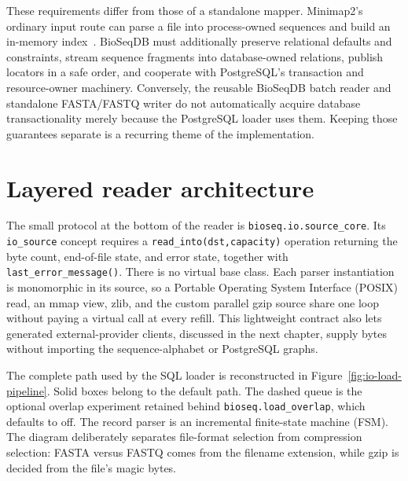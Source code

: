 These requirements differ from those of a standalone mapper. Minimap2's
ordinary input route can parse a file into process-owned sequences and build an
in-memory index~\cite{minimap2_paper}. BioSeqDB must additionally preserve
relational defaults and constraints, stream sequence fragments into
database-owned relations, publish locators in a safe order, and cooperate with
PostgreSQL's transaction and resource-owner machinery.  Conversely, the
reusable BioSeqDB batch reader and standalone FASTA/FASTQ writer do not
automatically acquire database transactionality merely because the PostgreSQL
loader uses them.  Keeping those guarantees separate is a recurring theme of
the implementation.

\section{Layered reader architecture}
\label{sec:io-reader-architecture}

The small protocol at the bottom of the reader is
\texttt{bioseq.io.source\_core}.  Its \texttt{io\_source} concept requires a
\texttt{read\_into(dst,capacity)} operation returning the byte count, end-of-file
state, and error state, together with \texttt{last\_error\_message()}.  There is
no virtual base class.  Each parser instantiation is monomorphic in its source,
so a Portable Operating System Interface (POSIX) read, an mmap view, zlib, and
the custom parallel gzip source share
one loop without paying a virtual call at every refill.  This lightweight
contract also lets generated external-provider clients, discussed in the next
chapter, supply bytes without importing the sequence-alphabet or PostgreSQL
graphs.

The complete path used by the SQL loader is reconstructed in
Figure~\ref{fig:io-load-pipeline}. Solid boxes belong to the default path.
The dashed queue is the optional overlap experiment retained behind
\texttt{bioseq.load\_overlap}, which defaults to off. The record parser is an
incremental finite-state machine (FSM).
The diagram deliberately separates file-format selection from compression
selection: FASTA versus FASTQ comes from the filename extension, while gzip is
decided from the file's magic bytes.

